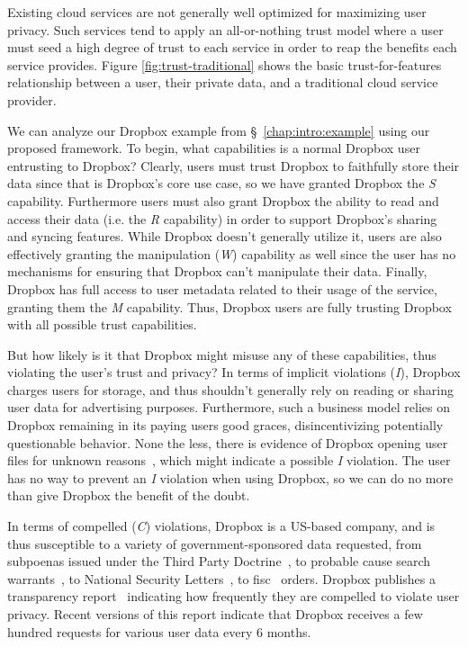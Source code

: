 Existing cloud services are not generally well optimized for
maximizing user privacy. Such services tend to apply an all-or-nothing
trust model where a user must seed a high degree of trust to each
service in order to reap the benefits each service provides. Figure
\ref{fig:trust-traditional} shows the basic trust-for-features
relationship between a user, their private data, and a traditional
cloud service provider.

We can analyze our Dropbox example from \S~\ref{chap:intro:example}
using our proposed framework. To begin, what capabilities is a normal
Dropbox user entrusting to Dropbox? Clearly, users must trust Dropbox
to faithfully store their data since that is Dropbox's core use case,
so we have granted Dropbox the \emph{S} capability. Furthermore users
must also grant Dropbox the ability to read and access their data
(i.e. the \emph{R} capability) in order to support Dropbox's sharing
and syncing features. While Dropbox doesn't generally utilize it,
users are also effectively granting the manipulation (\emph{W})
capability as well since the user has no mechanisms for ensuring
that Dropbox can't manipulate their data. Finally, Dropbox has full
access to user metadata related to their usage of the service,
granting them the \emph{M} capability. Thus, Dropbox users are fully
trusting Dropbox with all possible trust capabilities.

But how likely is it that Dropbox might misuse any of these
capabilities, thus violating the user's trust and privacy? In terms of
implicit violations (\emph{I}), Dropbox charges users for storage, and
thus shouldn't generally rely on reading or sharing user data for
advertising purposes. Furthermore, such a business model relies on
Dropbox remaining in its paying users good graces, disincentivizing
potentially questionable behavior. None the less, there is evidence of
Dropbox opening user files for unknown
reasons~\cite{vintsurf-dropbox}, which might indicate a possible
\emph{I} violation. The user has no way to prevent an \emph{I}
violation when using Dropbox, so we can do no more than give Dropbox
the benefit of the doubt.

In terms of compelled (\emph{C}) violations, Dropbox is a US-based
company, and is thus susceptible to a variety of government-sponsored
data requested, from subpoenas issued under the Third Party
Doctrine~\cite{thompson-thirdparty}, to probable cause search
warrants~\cite{us-constitution-amend4}, to National Security
Letters~\cite{fbi-nsl}, to fisc~\cite{fisc} orders. Dropbox publishes
a transparency report~\cite{dropbox-transparency} indicating how
frequently they are compelled to violate user privacy. Recent versions
of this report indicate that Dropbox receives a few hundred requests
for various user data every 6 months.

